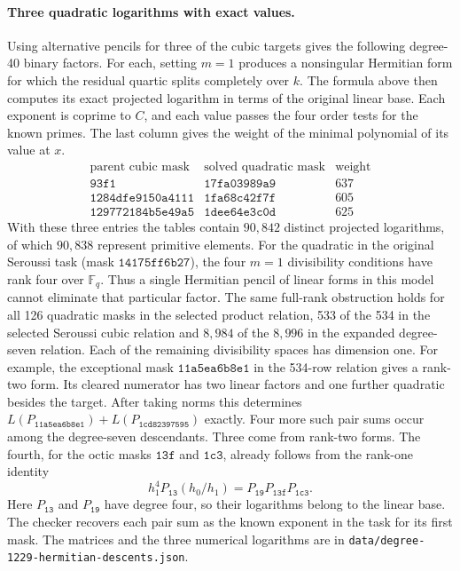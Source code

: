\documentclass[11pt]{article}
\begin{document}
\paragraph{Three quadratic logarithms with exact values.}
Using alternative pencils for three of the cubic targets gives
the following degree-40 binary factors. For each, setting \(m=1\)
produces a nonsingular Hermitian form for which the residual
quartic splits completely over \(k\). The formula above then computes
its exact projected logarithm in terms of the original linear base.
Each exponent is coprime to \(C\), and each value passes the four
order tests for the known primes. The last column gives the weight of
the minimal polynomial of its value at \(x\).
\[
\begin{array}{c|c|r}
 \text{parent cubic mask}&\text{solved quadratic mask}&\text{weight}\\\hline
 \mathtt{93f1}&\mathtt{17fa03989a9}&637\\
 \mathtt{1284dfe9150a4111}&\mathtt{1fa68c42f7f}&605\\
 \mathtt{129772184b5e49a5}&\mathtt{1dee64e3c0d}&625
\end{array}
\]
With these three entries the tables contain \(90{,}842\) distinct projected logarithms,
of which \(90{,}838\) represent primitive elements. For the quadratic
in the original Seroussi task (mask \(\mathtt{14175ff6b27}\)), the
four \(m=1\) divisibility conditions have rank four over \(\mathbb F_q\).
Thus a single Hermitian pencil of linear forms in this model cannot
eliminate that particular factor. The same full-rank obstruction holds
for all 126 quadratic masks in the selected product relation, 533
of the 534 in the selected Seroussi cubic relation and \(8{,}984\)
of the \(8{,}996\) in the expanded degree-seven relation. Each of the
remaining divisibility spaces has dimension one. For example, the
exceptional mask \(\mathtt{11a5ea6b8e1}\) in the 534-row relation
gives a rank-two form. Its cleared numerator has two linear factors
and one further quadratic besides the target. After taking norms this
determines \(L(P_{\mathtt{11a5ea6b8e1}})+L(P_{\mathtt{1cd82397595}})\)
exactly. Four more such pair sums occur among the degree-seven
descendants. Three come from rank-two forms. The fourth, for the
octic masks \(\mathtt{13f}\) and \(\mathtt{1c3}\), already follows
from the rank-one identity
\[
 h_1^4 P_{\mathtt{13}}(h_0/h_1)
    =P_{\mathtt{19}}P_{\mathtt{13f}}P_{\mathtt{1c3}} .
\]
Here \(P_{\mathtt{13}}\) and \(P_{\mathtt{19}}\) have degree four,
so their logarithms belong to the linear base. The checker recovers
each pair sum as the known exponent in the task for its first mask.
The matrices and the three numerical
logarithms are in \nolinkurl{data/degree-1229-hermitian-descents.json}.
\end{document}
